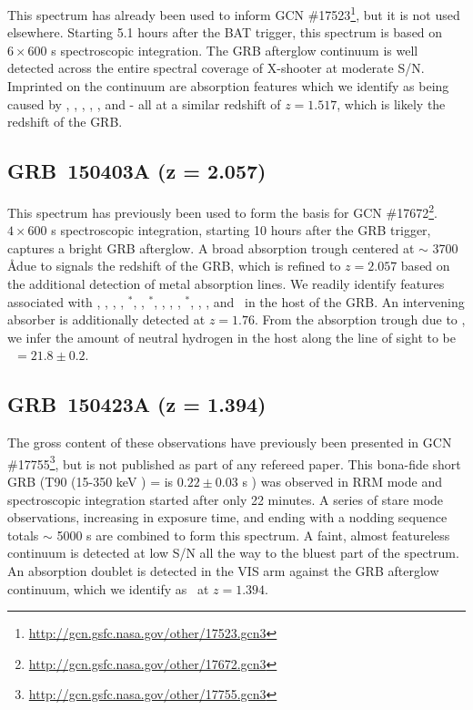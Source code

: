 \documentclass{aa}    %
\begin{document}
This spectrum has already been used to inform GCN
\#17523\footnote{\url{http://gcn.gsfc.nasa.gov/other/17523.gcn3}}, but it is not
used elsewhere. Starting 5.1 hours after the BAT trigger, this spectrum is based
on $6 \times 600$ s spectroscopic integration. The GRB afterglow continuum is
well detected across the entire spectral coverage of X-shooter at moderate S/N.
Imprinted on the continuum are absorption features which we identify as being
caused by \SIii, \civ, \alii, \feii, \mgii, and \mgi - all at a similar redshift
of $z = 1.517$, which is likely the redshift of the GRB.

\subsection{GRB~150403A (z = 2.057)}	

This spectrum has previously been used to form the basis for GCN
\#17672\footnote{\url{http://gcn.gsfc.nasa.gov/other/17672.gcn3}}. $4 \times
600$ s spectroscopic integration, starting 10 hours after the GRB trigger,
captures a bright GRB afterglow. A broad absorption trough centered at $\sim$
3700 \AA due to \lya signals the redshift of the GRB, which is refined to $z =
2.057$ based on the additional detection of metal absorption lines. We readily
identify features associated with \sii, \SIiv, \oi, \SIii, \SIii$^*$, \cii,
\cii$^*$, \civ, \alii, \feii, \feii$^*$, \mni, \mgii, and \mgi~in the host of
the GRB. An intervening \civ absorber is additionally detected at $z=1.76$. From
the absorption trough due to \lya, we infer the amount of neutral hydrogen in
the host along the line of sight to be \nh~$=21.8 \pm 0.2$.

\subsection{GRB~150423A (z = 1.394)}	

The gross content of these observations have previously been presented in GCN
\#17755\footnote{\url{http://gcn.gsfc.nasa.gov/other/17755.gcn3}}, but is not
published as part of any refereed paper. This bona-fide short GRB (T90 (15-350
keV ) = is $ 0.22 \pm 0.03$ s \citep{Lien2016}) was observed in RRM mode and
spectroscopic integration started after only 22 minutes. A series of stare mode
observations, increasing in exposure time, and ending with a nodding sequence
totals $\sim$ 5000 s are combined to form this spectrum. A faint, almost
featureless continuum is detected at low S/N all the way to the bluest part of
the spectrum. An absorption doublet is detected in the VIS arm against the GRB
afterglow continuum, which we identify as \mgii~at $z = 1.394$.
\end{document}
